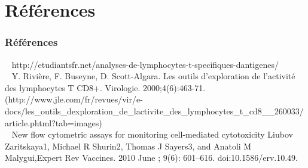 \documentclass[12pt]{beamer}
\begin{document}
\appendix

\section{Références}

\begin{frame}
  \transuncover
  \frametitle{Références}

  \textbullet~ http://etudiantsfr.net/analyses-de-lymphocytes-t-specifiques-dantigenes/\\
  \vfill
  \textbullet~ Y. Rivière, F. Buseyne, D. Scott-Algara. Les outils d’exploration de l’activité des lymphocytes T CD8+. Virologie. 2000;4(6):463-71. (http://www.jle.com/fr/revues/vir/e-docs/les\_outils\_dexploration\_de\_lactivite\_des\_lymphocytes\_t\_cd8\_\_260033/article.phtml?tab=images)\\
  \vfill
  \textbullet~ New flow cytometric assays for monitoring cell-mediated cytotoxicity Liubov Zaritskaya1, Michael R Shurin2, Thomas J Sayers3, and Anatoli M Malygui,Expert Rev Vaccines. 2010 June ; 9(6): 601–616. doi:10.1586/erv.10.49.
\end{frame}

	
\end{document}
